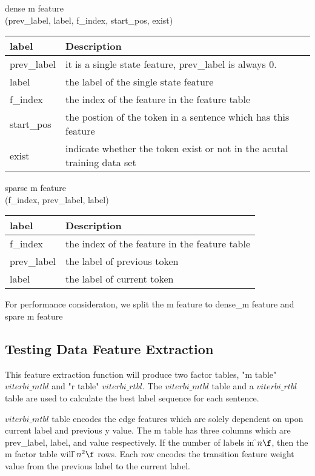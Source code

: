 dense m feature\\
(prev\_label, label, f\_index, start\_pos, exist)
\begin{center}
    \begin{tabular}{ | l | l |}
    \hline
    label & Description \\ \hline
    prev\_label & it is a single state feature, prev\_label is always 0.\\ 
    label       & the label of the single state feature\\
    f\_index    &  the index of the feature in the feature table\\
    start\_pos  & the postion of the token in a sentence which has this feature\\
    exist       & indicate whether the token exist or not in the acutal training data set\\
    \hline
    \end{tabular}
\end{center}

sparse m feature\\
(f\_index, prev\_label, label)
\begin{center}
    \begin{tabular}{ | l | l |}
    \hline
    label & Description \\ \hline
    f\_index    &  the index of the feature in the feature table\\
    prev\_label &  the label of previous token \\
    label       &  the label of current token\\
    \hline
    \end{tabular}
\end{center}

For performance consideraton, we split the m feature to dense\_m feature and spare m feature\\

\subsection{Testing Data Feature Extraction}
  This feature extraction function will produce two factor tables, "m table"
  $viterbi\_mtbl$ and "r table" $viterbi\_rtbl$. The $viterbi\_mtbl$
  table and a $viterbi\_rtbl$ table are used to calculate the best label
  sequence for each sentence.
 
  $viterbi\_mtbl$ table
  encodes the edge features which are solely dependent on upon current label and
  previous y value. The m table has three columns which are prev\_label, label,
  and value respectively.
  If the number of labels in \f$ n \f$, then the m factor table will \f$ n^2 \f$
  rows. Each row encodes the transition feature weight value from the previous label
  to the current label.
 
